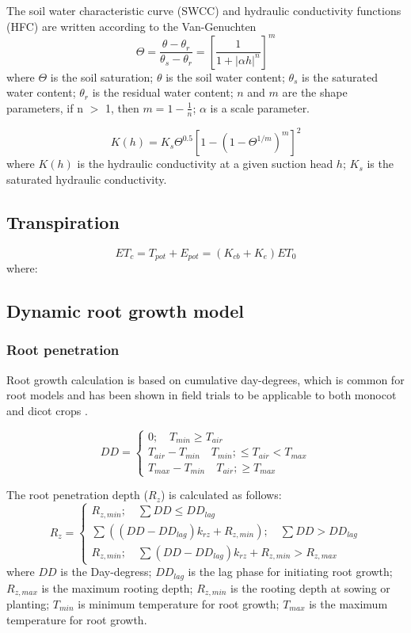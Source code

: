 The soil water characteristic curve (SWCC) and hydraulic conductivity functions (HFC) are written according to the Van-Genuchten \cite{Genuchten1980A}
\begin{equation}\Theta=\frac{\theta-\theta_r}{\theta_s-\theta_r}=[\frac{1}{1+|\alpha h|^n}]^m\end{equation}
where $\Theta$ is the soil saturation; $\theta$ is the soil water content; $\theta_s$ is the saturated water content; $\theta_r$ is the residual water content; $n$ and $m$ are the shape parameters, if n $>$ 1, then $m = 1 - \frac{1}{n}$; $\alpha$ is a scale parameter.

\begin{equation}K(h) = K_s \Theta^{0.5}[1-(1-\Theta^{1/m})^m]^2\end{equation}
where $K(h)$ is the hydraulic conductivity at a given suction head $h$; $K_s$ is the saturated hydraulic conductivity. 

\subsection{Transpiration}
\begin{equation}ET_c=T_{pot}+E_{pot}=(K_{cb}+K_e)ET_0\end{equation}
where:

\subsection{Dynamic root growth model}
\subsubsection{Root penetration}
Root growth calculation is based on cumulative day-degrees, which is common for root models and has been shown in field trials to be applicable to both monocot and dicot crops \cite{PedersenModelling}. 

\begin{equation}DD = \left \{\begin{array}{c}0; \quad T_{min} \ge T_{air} \\
T_{air}-T_{min}\quad T_{min}; \le T_{air} < T_{max} \\
T_{max}-T_{min}\quad T_{air}; \ge T_{max}\end{array} \right.\end{equation}

The root penetration depth ($R_z$) is calculated as follows:
\begin{equation}R_z = \left \{\begin{array}{c}R_{z,min}; \quad \sum DD \le DD_{lag} \\
\sum ((DD-DD_{lag})k_{rz}+R_{z,min});\quad \sum DD>DD_{lag} \\
R_{z,min};\quad \sum(DD-DD_{lag})k_{rz}+R_{z,min}>R_{z,max}\end{array} \right.\end{equation}
where $DD$ is the Day-degress; $DD_{lag}$ is the lag phase for initiating root growth;
$R_{z,max}$ is the maximum rooting depth; $R_{z,min}$ is the rooting depth at sowing or planting; $T_{min}$ is minimum temperature for root growth; $T_{max}$ is the maximum temperature for root growth.

